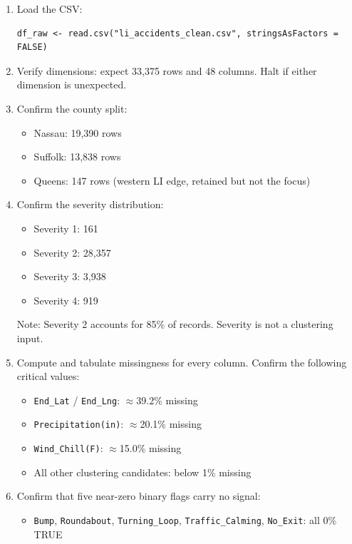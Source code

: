 \documentclass[11pt]{article}
\begin{document}
\begin{enumerate}
  \item Load the CSV:
  \begin{verbatim}
df_raw <- read.csv("li_accidents_clean.csv", stringsAsFactors = FALSE)
  \end{verbatim}

  \item Verify dimensions: expect 33,375 rows and 48 columns. Halt if either dimension is unexpected.

  \item Confirm the county split:
  \begin{itemize}
    \item Nassau: 19,390 rows
    \item Suffolk: 13,838 rows
    \item Queens: 147 rows (western LI edge, retained but not the focus)
  \end{itemize}

  \item Confirm the severity distribution:
  \begin{itemize}
    \item Severity 1: 161
    \item Severity 2: 28,357
    \item Severity 3: 3,938
    \item Severity 4: 919
  \end{itemize}
  Note: Severity 2 accounts for 85\% of records. Severity is not a clustering input.

  \item Compute and tabulate missingness for every column. Confirm the following critical values:
  \begin{itemize}
    \item \texttt{End\_Lat} / \texttt{End\_Lng}: $\approx$39.2\% missing
    \item \texttt{Precipitation(in)}: $\approx$20.1\% missing
    \item \texttt{Wind\_Chill(F)}: $\approx$15.0\% missing
    \item All other clustering candidates: below 1\% missing
  \end{itemize}

  \item Confirm that five near-zero binary flags carry no signal:
  \begin{itemize}
    \item \texttt{Bump}, \texttt{Roundabout}, \texttt{Turning\_Loop}, \texttt{Traffic\_Calming}, \texttt{No\_Exit}: all 0\% TRUE
  \end{itemize}


\end{enumerate}
\end{document}
